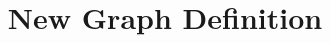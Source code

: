 \documentclass[acmsmall,screen]{acmart}
\begin{document}
\title[New Graph Definition]{New Graph Definition}



\end{document}
